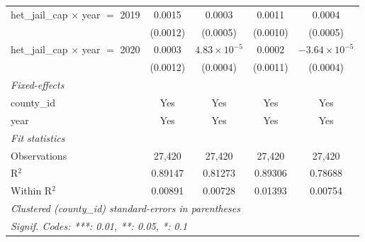 \begin{tabular}{lcccc}
   het\_jail\_cap $\times$ year $=$ 2019                & 0.0015                & 0.0003                    & 0.0011                 & 0.0004\\   
                                                        & (0.0012)              & (0.0005)                  & (0.0010)               & (0.0005)\\   
   het\_jail\_cap $\times$ year $=$ 2020                & 0.0003                & $4.83\times 10^{-5}$      & 0.0002                 & $-3.64\times 10^{-5}$\\    
                                                        & (0.0012)              & (0.0004)                  & (0.0011)               & (0.0004)\\   
   \midrule
   \emph{Fixed-effects}\\
   county\_id                                           & Yes                   & Yes                       & Yes                    & Yes\\  
   year                                                 & Yes                   & Yes                       & Yes                    & Yes\\  
   \midrule
   \emph{Fit statistics}\\
   Observations                                         & 27,420                & 27,420                    & 27,420                 & 27,420\\  
   R$^2$                                                & 0.89147               & 0.81273                   & 0.89306                & 0.78688\\  
   Within R$^2$                                         & 0.00891               & 0.00728                   & 0.01393                & 0.00754\\  
   \midrule \midrule
   \multicolumn{5}{l}{\emph{Clustered (county\_id) standard-errors in parentheses}}\\
   \multicolumn{5}{l}{\emph{Signif. Codes: ***: 0.01, **: 0.05, *: 0.1}}\\
\end{tabular}
\par\endgroup


